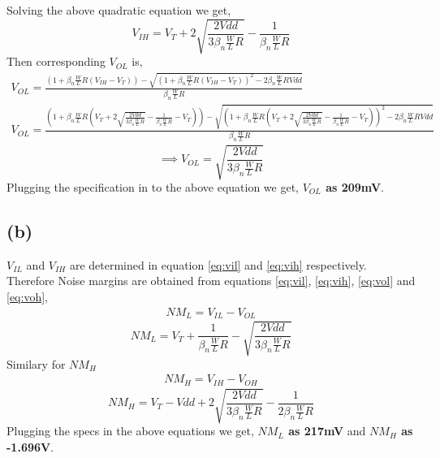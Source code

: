 \documentclass{article}
\begin{document}
Solving the above quadratic equation we get,
\begin{equation} \label{eq:vih}
	V_{IH} = V_T + 2\sqrt{\frac{2Vdd}{3{{\beta}_n}{\frac{W}{L}}R}} - \frac{1}{{{\beta}_n}{\frac{W}{L}}R}
\end{equation}
Then corresponding $V_{OL}$ is,
\begin{gather*}
V_{OL} = \frac{\left(1 + {{\beta}_n}{\frac{W}{L}}R(V_{IH} - V_T)\right) - \sqrt{\left(1 + {{\beta}_n}{\frac{W}{L}}R(V_{IH} - V_T)\right)^2 - 2{{\beta}_n}{\frac{W}{L}}RVdd}}{{{\beta}_n}{\frac{W}{L}}R} \\
V_{OL} = \frac{\left(1 + {{\beta}_n}{\frac{W}{L}}R(V_T + 2\sqrt{\frac{2Vdd}{3{{\beta}_n}{\frac{W}{L}}R}} - \frac{1}{{{\beta}_n}{\frac{W}{L}}R} - V_T)\right) - \sqrt{\left(1 + {{\beta}_n}{\frac{W}{L}}R(V_T + 2\sqrt{\frac{2Vdd}{3{{\beta}_n}{\frac{W}{L}}R}} - \frac{1}{{{\beta}_n}{\frac{W}{L}}R} - V_T)\right)^2 - 2{{\beta}_n}{\frac{W}{L}}RVdd}}{{{\beta}_n}{\frac{W}{L}}R}
\end{gather*}
\begin{equation} \label{eq:vol}
\implies V_{OL} = \sqrt{\frac{2Vdd}{3{{\beta}_n}{\frac{W}{L}}R}}
\end{equation}
Plugging the specification in to the above equation we get, \textbf{$V_{OL}$ as 209mV}.

\subsection*{(b)}
$V_{IL}$ and $V_{IH}$ are determined in equation \eqref{eq:vil} and \eqref{eq:vih} respectively.\\
Therefore Noise margins are obtained from equations \eqref{eq:vil}, \eqref{eq:vih}, \eqref{eq:vol} and \eqref{eq:voh},
\begin{gather*}
	NM_L = V_{IL} - V_{OL}
\end{gather*}
\begin{equation} \label{eq:nml}
	NM_L = V_T + \frac{1}{{{\beta}_n}{\frac{W}{L}}R} - \sqrt{\frac{2Vdd}{3{{\beta}_n}{\frac{W}{L}}R}}
\end{equation}
Similary for $NM_H$
\begin{gather*}
	NM_H = V_{IH} - V_{OH}
\end{gather*}
\begin{equation} \label{eq:nmh}
	NM_H = V_T - Vdd + 2\sqrt{\frac{2Vdd}{3{{\beta}_n}{\frac{W}{L}}R}} - \frac{1}{2{{\beta}_n}{\frac{W}{L}}R}
\end{equation}
Plugging the specs in the above equations we get, \textbf{$NM_L$ as 217mV} and \textbf{$NM_H$ as -1.696V}.
\end{document}
